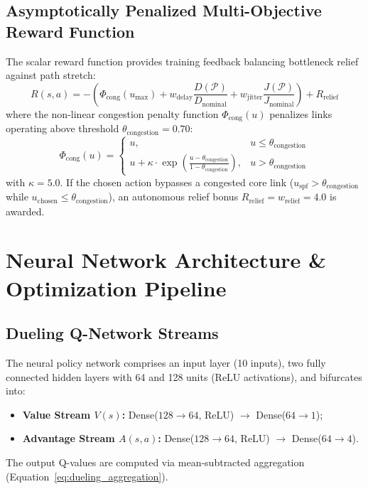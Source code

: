 \documentclass[12pt,a4paper,oneside]{report}
\begin{document}
\subsection{Asymptotically Penalized Multi-Objective Reward Function}
The scalar reward function provides training feedback balancing bottleneck relief against path stretch:
\begin{equation}
R(s, a) = - \left( \Phi_{\mathrm{cong}}(u_{\max}) + w_{\mathrm{delay}} \frac{D(\mathcal{P})}{D_{\mathrm{nominal}}} + w_{\mathrm{jitter}} \frac{J(\mathcal{P})}{J_{\mathrm{nominal}}} \right) + R_{\mathrm{relief}}
\label{eq:reward_function}
\end{equation}
where the non-linear congestion penalty function $\Phi_{\mathrm{cong}}(u)$ penalizes links operating above threshold $\theta_{\mathrm{congestion}} = 0.70$:
\begin{equation}
\Phi_{\mathrm{cong}}(u) = 
\begin{cases}
u, & u \le \theta_{\mathrm{congestion}} \\
u + \kappa \cdot \exp\left( \frac{u - \theta_{\mathrm{congestion}}}{1 - \theta_{\mathrm{congestion}}} \right), & u > \theta_{\mathrm{congestion}}
\end{cases}
\end{equation}
with $\kappa = 5.0$. If the chosen action bypasses a congested core link ($u_{\mathrm{spf}} > \theta_{\mathrm{congestion}}$ while $u_{\mathrm{chosen}} \le \theta_{\mathrm{congestion}}$), an autonomous relief bonus $R_{\mathrm{relief}} = w_{\mathrm{relief}} = 4.0$ is awarded.

\section{Neural Network Architecture \& Optimization Pipeline}

\subsection{Dueling Q-Network Streams}
The neural policy network comprises an input layer (10 inputs), two fully connected hidden layers with 64 and 128 units (ReLU activations), and bifurcates into:
\begin{itemize}
  \item \textbf{Value Stream $V(s)$:} Dense($128 \to 64$, ReLU) $\to$ Dense($64 \to 1$);
  \item \textbf{Advantage Stream $A(s, a)$:} Dense($128 \to 64$, ReLU) $\to$ Dense($64 \to 4$).
\end{itemize}
The output Q-values are computed via mean-subtracted aggregation (Equation~\ref{eq:dueling_aggregation}).
\end{document}
